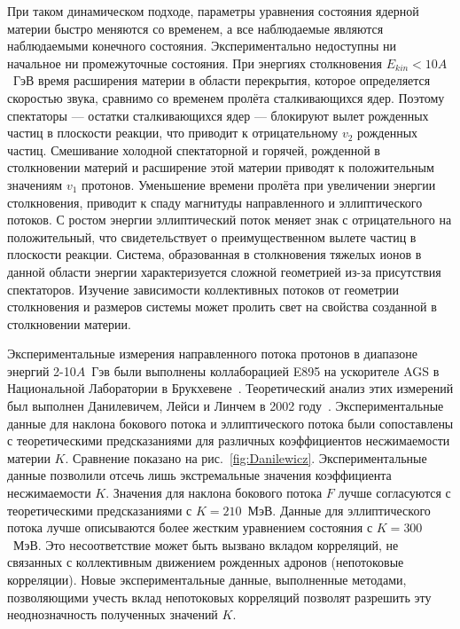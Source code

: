 При таком динамическом подходе, параметры уравнения состояния ядерной материи быстро меняются со временем, а все наблюдаемые являются наблюдаемыми конечного состояния. 
Экспериментально недоступны ни начальное ни промежуточные состояния. 
При энергиях столкновения $E_{kin}<10A$~ГэВ время расширения материи в области перекрытия, которое определяется скоростью звука, сравнимо со временем пролёта сталкивающихся ядер.
Поэтому спектаторы --- остатки сталкивающихся ядер --- блокируют вылет рожденных частиц в плоскости реакции, что приводит к отрицательному $v_2$ рожденных частиц. 
Смешивание холодной спектаторной и горячей, рожденной в столкновении материй и расширение этой материи приводят к положительным значениям $v_1$ протонов.
Уменьшение времени пролёта при увеличении энергии столкновения, приводит к спаду магнитуды направленного и эллиптического потоков. 
С ростом энергии эллиптический поток меняет знак с отрицательного на положительный, что свидетельствует о преимущественном вылете частиц в плоскости реакции.
Система, образованная в столкновения тяжелых ионов в данной области энергии характеризуется сложной геометрией из-за присутствия спектаторов.
Изучение зависимости коллективных потоков от геометрии столкновения и размеров системы может пролить свет на свойства созданной в столкновении материи.

Экспериментальные измерения направленного потока протонов в диапазоне энергий 2-10$A$~Гэв были выполнены коллаборацией E895 на ускорителе AGS в Национальной Лаборатории в Брукхевене~\cite{E895:2000maf}. 
Теоретический анализ этих измерений был выполнен Данилевичем, Лейси и Линчем в 2002 году~\cite{Danielewicz:2002pu}.
Экспериментальные данные для наклона бокового потока и эллиптического потока были сопоставлены с теоретическими предсказаниями для различных коэффициентов несжимаемости материи $K$.
Сравнение показано на рис.~\ref{fig:Danilewicz}. 
Экспериментальные данные позволили отсечь лишь экстремальные значения коэффициента несжимаемости $K$.
Значения для наклона бокового потока $F$ лучше согласуются с теоретическими предсказаниями с $K=210$~МэВ. 
Данные для эллиптического потока лучше описываются более жестким уравнением состояния с $K=300$~МэВ.
Это несоответствие может быть вызвано вкладом корреляций, не связанных с коллективным движением рожденных адронов (непотоковые корреляции).
Новые экспериментальные данные, выполненные методами, позволяющими учесть вклад непотоковых корреляций позволят разрешить эту неоднозначность полученных значений $K$.

